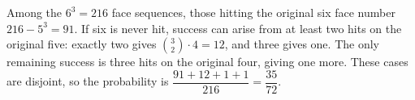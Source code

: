 Among the $6^3=216$ face sequences, those hitting the original six face number $216-5^3=91$. If six is never hit, success can arise from at least two hits on the original five: exactly two gives $\binom32\cdot4=12$, and three gives one. The only remaining success is three hits on the original four, giving one more. These cases are disjoint, so the probability is $\dfrac{91+12+1+1}{216}=\boxed{\dfrac{35}{72}}$.
